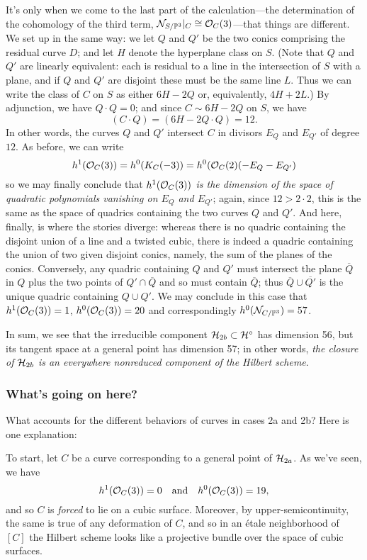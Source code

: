 It's only when we come to the last part of the calculation---the determination of the cohomology of the third term, ${\mathcal N}_{S/{\mathbb P}^3}|_C \cong {\mathcal O}_C(3)$---that things are different. We set up in the same way: we let $Q$ and $Q'$ be the  two conics comprising the residual curve $D$; and let $H$ denote the hyperplane class on $S$. (Note that $Q$ and $Q'$ are linearly equivalent: each is residual to a line in the intersection of $S$ with a plane, and if $Q$ and $Q'$ are disjoint these  must be the same line $L$. Thus we can write the class of $C$ on $S$ as either $6H-2Q$ or, equivalently, $4H+2L$.)
By adjunction, we have $Q \cdot Q = 0$; and since $C \sim 6H - 2Q$ on $S$, we have
$$
(C\cdot Q) = (6H - 2Q \cdot Q) = 12.
$$
In other words, the curves $Q$ and $Q'$ intersect $C$ in divisors $E_Q$ and $E_{Q'}$ of degree $12$. As before, we can write
$$
h^1({\mathcal O}_C(3)) = h^0(K_C(-3)) = h^0({\mathcal O}_C(2)(-E_Q-E_{Q'})
$$
so we may finally conclude that \emph{$h^1({\mathcal O}_C(3))$ is the dimension of the space of quadratic polynomials vanishing on $E_Q$ and $E_{Q'}$}; again, since $12 > 2\cdot 2$, this is the same as the space of quadrics containing the two curves $Q$ and $Q'$. And here, finally, is where the stories diverge: whereas there is no quadric containing the disjoint union of a line and a twisted cubic, there is indeed a quadric containing the union of two given disjoint conics, namely, the sum of the planes of the conics. Conversely, any quadric containing $Q$ and $Q'$ must intersect the plane $\overline Q$ in $Q$ plus the two points of $Q' \cap \overline Q$ and so must contain $\overline Q$; thus $\overline Q \cup \overline {Q'}$ is the unique quadric containing $Q \cup Q'$.  
 We may conclude in this case that $h^1({\mathcal O}_C(3))=1$,  $h^0({\mathcal O}_C(3)) = 20$ and correspondingly $h^0({\mathcal N}_{C/{\mathbb P}^3}) = 57$.
 
 In sum, we see that the irreducible component ${\cal H}_{2b} \subset {\cal H}^\circ$ has dimension 56, but its tangent space at a general point has dimension 57; in other words, \emph{the closure of ${\cal H}_{2b}$ is an everywhere nonreduced component of the Hilbert scheme}.

\subsubsection{What's going on here?}

What accounts for the different behaviors of curves in cases 2a and 2b? Here is one explanation:

To start, let $C$ be a curve corresponding to a general point of ${\cal H}_{2a}$. As we've seen, we have
$$
h^1({\mathcal O}_C(3)) = 0 \quad \text{and} \quad h^0({\mathcal O}_C(3)) = 19,
$$
and so $C$ is \emph{forced} to lie on a cubic surface. Moreover, by upper-semicontinuity, the same is true of any deformation of $C$, and so in an \'etale neighborhood of $[C]$ the Hilbert scheme looks like a projective bundle over the space of cubic surfaces.

